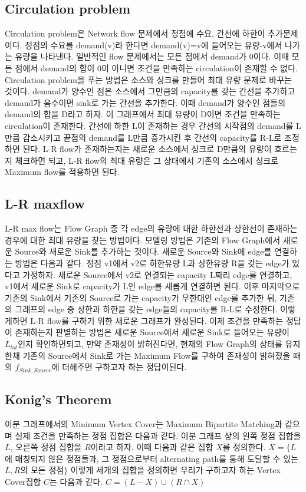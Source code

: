 \documentclass[10pt,landscape,a4paper,twocolumn]{article}
\begin{document}
\subsection{Circulation problem}
\hspace{1em}Circulation problem은 Network flow 문제에서 정점에 수요, 간선에 하한이 추가문제이다. 정점의 수요를 demand(v)라 한다면 demand(v)=v에 들어오는 유량-v에서 나가는 유량을 나타낸다. 일반적인 flow 문제에서는 모든 점에서 demand가 0이다. 이때 모든 점에서 demand의 합이 0이 아니면 조건을 만족하는 circulation이 존재할 수 없다. Circulation problem을 푸는 방법은 소스와 싱크를 만들어 최대 유량 문제로 바꾸는 것이다. demand가 양수인 점은 소스에서 그만큼의 capacity를 갖는 간선을 추가하고 demand가 음수이면 sink로 가는 간선을 추가한다. 이때 demand가 양수인 점들의 demand의 합을 D라고 하자. 이 그래프에서 최대 유량이 D이면 조건을 만족하는 circulation이 존재한다. 간선에 하한 L이 존재하는 경우 간선의 시작점의 demand를 L만큼 감소시키고 끝점의 demand를 L만큼 증가시킨 후 간선의 capacity를 R-L로 조정하면 된다. L-R flow가 존재하는지는 새로운 소스에서 싱크로 D만큼의 유량이 흐르는지 체크하면 되고, L-R flow의 최대 유량은 그 상태에서 기존의 소스에서 싱크로 Maximum flow를 적용하면 된다.

\subsection{L-R maxflow}
\hspace{1em}L-R max flow는 Flow Graph 중 각 edge의 유량에 대한 하한선과 상한선이 존재하는 경우에 대한 최대 유량을 찾는 방법이다. 모델링 방법은 기존의 Flow Graph에서 새로운 Source와 새로운 Sink를 추가하는 것이다. 새로운 Source와 Sink에 edge를 연결하는 방법은 다음과 같다. 정점 v1에서 v2로 하한유량 L과 상한유량 R을 갖는 edge가 있다고 가정하자. 새로운 Source에서 v2로 연결되는 capacity L짜리 edge를 연결하고, v1에서 새로운 Sink로 capacity가 L인 edge를 새롭게 연결하면 된다. 이후 마지막으로 기존의 Sink에서 기존의 Source로 가는 capacity가 무한대인 edge를 추가한 뒤, 기존의 그래프의 edge 중 상한과 하한을 갖는 edge들의 capacity를 R-L로 수정한다. 이렇게하면 L-R flow를 구하기 위한 새로운 그래프가 완성된다. 이제 조건을 만족하는 정답이 존재하는지 판별하는 방법은 새로운 Source에서 새로운 Sink로 들어오는 유량이 $L_{tot}$인지 확인하면되고, 만약 존재성이 밝혀진다면, 현재의 Flow Graph의 상태를 유지한채 기존의 Source에서 Sink로 가는 Maximum Flow를 구하여 존재성이 밝혀졌을 때의 $f_{Sink,Source}$에 더해주면 구하고자 하는 정답이된다.

\subsection{Konig's Theorem}
\hspace{1em}이분 그래프에서의 Minimum Vertex Cover는 Maximum Bipartite Matching과 같으며 실제 조건을 만족하는 정점 집합은 다음과 같다. 이분 그래프 상의 왼쪽 정점 집합을 $L$, 오른쪽 정점 집합을 $R$이라고 하자. 이때 다음과 같은 집합 $X$를 정의한다. $X=\{L$에 매칭되지 않은 정점들과, 그 정점으로부터 alternating path를 통해 도달할 수 있는 $L, R$의 모든 정점$\}$ 이렇게 세개의 집합을 정의하면 우리가 구하고자 하는 Vertex Cover집합 $C$는 다음과 같다. $C=(L-X)\cup{(R\cap{X})}$\\
\end{document}
